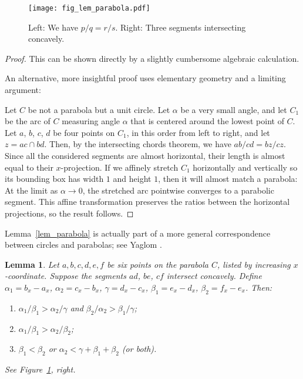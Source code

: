 \documentclass[11pt]{article}
\newtheorem{lemma}[theorem]{Lemma}
\theoremstyle{definition}
\theoremstyle{remark}
\begin{document}
\begin{figure}
\centerline{\texttt{[image: fig\_lem\_parabola.pdf]}}
\caption{\label{fig_lem_parabola}Left: We have $p/q = r/s$. Right: Three segments intersecting concavely.}
\end{figure}

\begin{proof}
This can be shown directly by a slightly cumbersome algebraic calculation.

An alternative, more insightful proof uses elementary geometry and a limiting argument:

Let $C$ be not a parabola but a unit circle. Let $\alpha$ be a very small angle, and let $C_1$ be the arc of $C$ measuring angle $\alpha$ that is centered around the lowest point of $C$. Let $a$, $b$, $c$, $d$ be four points on $C_1$, in this order from left to right, and let $z=ac\cap bd$. Then, by the intersecting chords theorem, we have $ab/cd = bz/cz$. Since all the considered segments are almost horizontal, their length is almost equal to their $x$-projection. If we affinely stretch $C_1$ horizontally and vertically so its bounding box has width $1$ and height $1$, then it will almost match a parabola: At the limit as $\alpha\to 0$, the stretched arc pointwise converges to a parabolic segment. This affine transformation preserves the ratios between the horizontal projections, so the result follows.
\end{proof}

Lemma~\ref{lem_parabola} is actually part of a more general correspondence between circles and parabolas; see Yaglom \cite{yaglom}.

\begin{lemma}\label{lem_ratios}
Let $a,b,c,d,e,f$ be six points on the parabola $C$, listed by increasing $x$-coordinate. Suppose the segments $ad$, $be$, $cf$ intersect concavely. Define $\alpha_1 = b_x - a_x$, $\alpha_2 = c_x-b_x$, $\gamma = d_x-c_x$, $\beta_1 = e_x-d_x$, $\beta_2 = f_x-e_x$. Then:
\begin{enumerate}
\item $\alpha_1/\beta_1 > \alpha_2/\gamma$ and $\beta_2/\alpha_2 > \beta_1/\gamma$;
\item $\alpha_1/\beta_1 > \alpha_2/\beta_2$;
\item $\beta_1 < \beta_2$ or $\alpha_2 < \gamma+\beta_1+\beta_2$ (or both).
\end{enumerate}
See Figure~\ref{fig_lem_parabola}, right.
\end{lemma}
\end{document}
